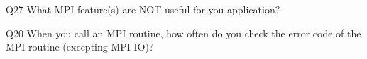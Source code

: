\begin{description}%
\item{Q27} What MPI feature(s) are NOT useful for you application?%
\item{Q20} When you call an MPI routine, how often do you check the error code of the MPI routine  (excepting MPI-IO)?%
\end{description}%
